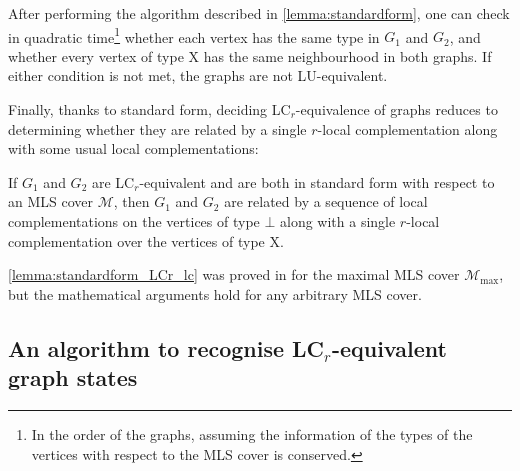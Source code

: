 \documentclass[a4paper,UKenglish,cleveref,autoref,thm-restate]{arxiv}
\begin{document}
After performing the algorithm described in \cref{lemma:standardform}, one can check in quadratic time\footnote{In the order of the graphs, assuming the information of the types of the vertices with respect to the MLS cover is conserved.} whether each vertex has the same type  in $G_1$ and $G_2$, and whether every vertex of type X has the same neighbourhood in both graphs. If either condition is not met, the graphs are not LU-equivalent.


Finally, thanks to standard form, deciding LC$_r$-equivalence of graphs reduces to determining whether they are related by a single $r$-local complementation along with some usual local complementations:
\begin{lemma} \label{lemma:standardform_LCr_lc}
    If $G_1$ and $G_2$ are LC$_r$-equivalent and are both in standard form with respect to an MLS cover $\mathcal M$, then $G_1$ and $G_2$ are related by a sequence of local complementations on the vertices of type $\bot$ along with a single $r$-local complementation over the vertices of type X. \end{lemma}


\cref{lemma:standardform_LCr_lc} was proved in \cite{claudet2024local} for the maximal MLS cover $\mathcal M_\text{max}$, but the mathematical arguments hold for any arbitrary MLS cover. 


\subsection{An algorithm to recognise \texorpdfstring{LC$_r$}{LCr}-equivalent graph states} \label{subsec:algorithm_lcr}
\end{document}
